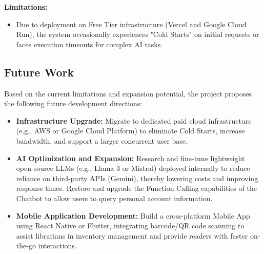 \textbf{Limitations:}
\begin{itemize}
    \item Due to deployment on Free Tier infrastructure (Vercel and Google Cloud Run), the system occasionally experiences "Cold Starts" on initial requests or faces execution timeouts for complex AI tasks.
\end{itemize}

\subsection{Future Work}
Based on the current limitations and expansion potential, the project proposes the following future development directions:
\begin{itemize}
    \item \textbf{Infrastructure Upgrade:} Migrate to dedicated paid cloud infrastructure (e.g., AWS or Google Cloud Platform) to eliminate Cold Starts, increase bandwidth, and support a larger concurrent user base.
    \item \textbf{AI Optimization and Expansion:} Research and fine-tune lightweight open-source LLMs (e.g., Llama 3 or Mistral) deployed internally to reduce reliance on third-party APIs (Gemini), thereby lowering costs and improving response times. Restore and upgrade the Function Calling capabilities of the Chatbot to allow users to query personal account information.

    \item \textbf{Mobile Application Development:} Build a cross-platform Mobile App using React Native or Flutter, integrating barcode/QR code scanning to assist librarians in inventory management and provide readers with faster on-the-go interactions.
\end{itemize}